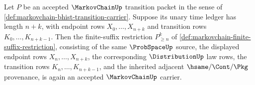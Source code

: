 \begin{theorem}
\label{thm:markovchain-finite-suffix-restriction-carrier}
Let $P$ be an accepted $\MarkovChainUp$ transition packet in the sense of \autoref{def:markovchain-bhist-transition-carrier}. Suppose its unary time ledger has length $n+k$, with endpoint rows $X_0,\ldots,X_{n+k}$ and transition rows $K_0,\ldots,K_{n+k-1}$. Then the finite-suffix restriction $P_{\ge n}^{k}$ of \autoref{def:markovchain-finite-suffix-restriction}, consisting of the same $\ProbSpaceUp$ source, the displayed endpoint rows $X_n,\ldots,X_{n+k}$, the corresponding $\DistributionUp$ law rows, the transition rows $K_n,\ldots,K_{n+k-1}$, and the inherited adjacent $\hsame/\Cont/\Pkg$ provenance, is again an accepted $\MarkovChainUp$ carrier.
\end{theorem}
